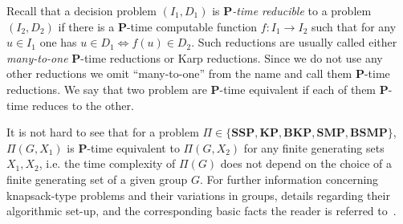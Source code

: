 \documentclass[10pt]{amsart}
\theoremstyle{definition}
\def\P{{\mathbf{P}}}
\def\SSP{{\mathbf{SSP}}}
\def\SMP{{\mathbf{SMP}}}
\def\BSMP{{\mathbf{BSMP}}}
\def\BKP{{\mathbf{BKP}}}
\def\KP{{\mathbf{KP}}}
\begin{document}
\medskip
Recall that a decision problem $(I_1,D_1)$ is  {\em $\P$-time  reducible}
to  a problem $(I_2,D_2)$ if there is a $\P$-time computable function
$f:I_1  \to I_2$  such that for any $u \in I_1$ one has $u \in D_1 \Longleftrightarrow f(u) \in D_2$.
Such reductions are usually called either {\em many-to-one} $\P$-time reductions or Karp reductions.
Since we do not use any other reductions we omit ``many-to-one'' from the name and call them $\P$-time reductions. We say that two problem are $\P$-time equivalent if each of them $\P$-time reduces to the other.

It is not hard to see that for a problem $\Pi\in \{\SSP, \KP, \BKP, \SMP, \BSMP\}$, $\Pi(G,X_1)$ is $\P$-time equivalent to $\Pi(G,X_2)$ for any finite generating sets $X_1,X_2$, i.e. the time complexity of $\Pi(G)$ does not depend on the choice of a finite generating set of a given group $G$.
For further information concerning knapsack-type problems and their variations in groups, details regarding their algorithmic set-up, and the corresponding basic facts the reader is referred to~\cite{MNU1}.
\end{document}
